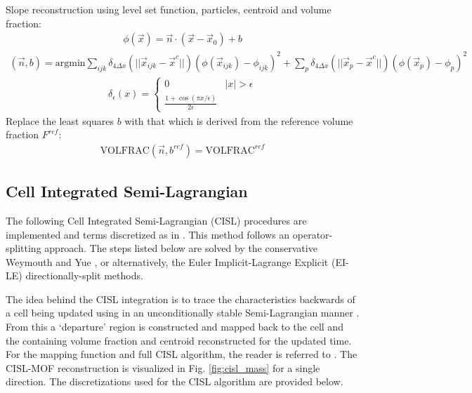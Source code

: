 \documentclass[preprint,12pt]{Definitions/elsarticle}
\begin{document}
\begin{enumerate}
\newpage

\par\noindent
Slope reconstruction using level set function, particles, centroid and
volume fraction:
\begin{eqnarray*}
 \phi(\vec{x})=\vec{n}\cdot(\vec{x}-\vec{x}_{0})+b
\end{eqnarray*}
\begin{eqnarray*}
(\vec{n},b)=\mbox{argmin}
 \sum_{ijk}\delta_{4\Delta x}(||\vec{x}_{ijk}-\vec{x}^{c}||)
 (\phi(\vec{x}_{ijk})-\phi_{ijk})^{2}+
 \sum_{p}\delta_{4\Delta x}(||\vec{x}_{p}-\vec{x}^{c}||)
 (\phi(\vec{x}_{p})-\phi_{p})^{2}
\end{eqnarray*}
\begin{eqnarray*}
	\delta_{\epsilon}(x)=\left\{ \begin{array}{cc}
		0 & |x|>\epsilon \\
		\frac{1+\cos(\pi x/\epsilon)}{2\epsilon}
	\end{array} \right.
\end{eqnarray*}
Replace the least squares $b$ with that which is derived from the 
reference volume fraction $F^{ref}$:
\begin{eqnarray*}
\mbox{VOLFRAC}(\vec{n},b^{ref})=\mbox{VOLFRAC}^{ref}
\end{eqnarray*}

\newpage
	\subsection{Cell Integrated Semi-Lagrangian}\label{CISL}
	The following Cell Integrated Semi-Lagrangian (CISL) procedures are implemented and terms discretized as in \cite{pei2019hierarchical, LiETAL2015IncompressibleMultiphase,VAHAB2021}. This method follows an operator-splitting approach. The steps listed below are solved by the conservative  Weymouth and Yue \cite{WeymouthYue2010conservative}, or alternatively, the Euler Implicit-Lagrange Explicit (EI-LE) \cite{scardovelli2003interface,aulisa2007DirSplit} directionally-split methods. 
	
	The idea behind the CISL integration is to trace the characteristics backwards of a cell being updated using in an unconditionally stable Semi-Lagrangian manner \cite{STRAIN1999semiLagrangian, wang2012hybrid}. From this a `departure' region is constructed and mapped back to the cell and the containing volume fraction and centroid reconstructed for the updated time. For the mapping function and full CISL algorithm, the reader is referred to \cite{LiETAL2015IncompressibleMultiphase}. The CISL-MOF reconstruction is visualized in Fig. \ref{fig:cisl_mass} for a single direction. The discretizations used for the CISL algorithm are provided below.
	

\end{enumerate}
\end{document}
